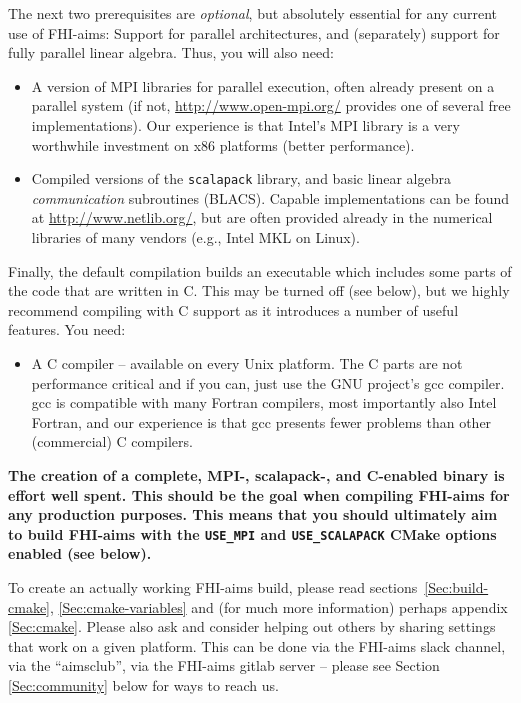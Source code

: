 The next two prerequisites are \emph{optional}, but absolutely
essential for any current use of FHI-aims: Support for parallel
architectures, and (separately) support for fully parallel
linear algebra. Thus, you will also
need: 
\begin{itemize}
  \item A version of MPI libraries for parallel execution, often already
    present on a parallel system (if not,
    \url{http://www.open-mpi.org/} provides one of several free
    implementations). Our experience is that Intel's MPI library is
    a very worthwhile investment on x86 platforms (better performance).
  \item Compiled versions of the \texttt{scalapack} library, and
     basic linear algebra \emph{communication} subroutines (BLACS). Capable
     implementations can be found at \url{http://www.netlib.org/}, but
     are often provided already in the numerical libraries of many
     vendors (e.g., Intel MKL on Linux).
\end{itemize}
Finally, the default compilation builds an executable which includes
some parts of the code that are written in C. This may be turned off (see
below), but we highly recommend compiling with C support as it introduces a
number of useful features.  You need:
\begin{itemize}
  \item A C compiler -- available on every Unix platform. The C parts
    are not performance critical and if you can, just use the GNU
    project's gcc compiler. gcc is compatible with many Fortran
    compilers, most importantly also Intel Fortran, and our experience
    is that gcc presents fewer problems than other (commercial) C
    compilers. 
\end{itemize}
  
\textbf{The creation of a complete, MPI-, scalapack-, and C-enabled binary
  is effort well spent. This should be the goal when compiling FHI-aims
  for any production purposes. This means that you should ultimately
  aim to build FHI-aims with the \texttt{USE\_MPI} and \texttt{USE\_SCALAPACK} CMake options enabled (see below).}

To create an actually working FHI-aims build, please read sections~\ref{Sec:build-cmake}, \ref{Sec:cmake-variables} and (for much more information) perhaps appendix \ref{Sec:cmake}. Please also ask and consider helping out others by sharing settings that work on a given platform. This can be done via the FHI-aims slack channel, via the ``aimsclub'', via the FHI-aims gitlab server -- please see Section \ref{Sec:community} below for ways to reach us.

